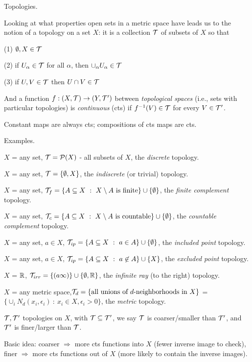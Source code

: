 \documentclass[12pt]{article}
\begin{document}
\msk

Topologies.

Looking at what properties open sets in a metric space have leads us to the 
notion of a topology on a set $X$: it is a collection ${\mathcal T}$ of subsets of $X$ so that

(1) $\emptyset,X\in {\mathcal T}$

(2) if $U_\alpha\in{\mathcal T}$ for all $\alpha$, then $\cup_\alpha U_\alpha\in{\mathcal T}$

(3) if $U,V\in{\mathcal T}$ then $U\cap V\in{\mathcal T}$

And a function $f:(X,{\mathcal T})\rightarrow(Y,{\mathcal T}^\prime)$ between {\it topological spaces}
(i.e., sets with particular topologies) is {\it continuous} (cts) if
$f^{-1}(V)\in{\mathcal T}$ for every $V\in{\mathcal T}^\prime$.

Constant maps are always cts; compositions of cts maps are cts.

\msk

Examples.

$X$ = any set, ${\mathcal T}={\mathcal P}(X)$ - all subsets of $X$, the {\it discrete} topology.

$X$ = any set, ${\mathcal T}=\{\emptyset,X\}$, the {\it indiscrete} (or trivial) topology.

$X$ = any set, $\mt_f=\{A\subseteq X\ :\ X\setminus A\ \textrm{is finite}\}\cup\{\emptyset\}$, the {\it finite complement} topology.

$X$ = any set, $\mt_c=\{A\subseteq X\ :\ X\setminus A\ \textrm{is countable}\}\cup\{\emptyset\}$, the {\it countable complement} topology.

$X$ = any set, $a\in X$, ${\mathcal T}_{ip}=\{A\subseteq X\ :\ a\in A\}\cup\{\emptyset\}$, the {\it included point} topology.

$X$ = any set, $a\in X$, ${\mathcal T}_{ip}=\{A\subseteq X\ :\ a\not\in A\}\cup\{X\}$, the {\it excluded point} topology.

$X$ = ${\mathbb R}$, ${\mathcal T}_{irr}=\{(a\infty)\}\cup\{\emptyset,{\mathbb R}\}$, the {\it infinite ray} (to the right) topology.

$X$ = any metric space,${\mathcal T}_{d}=\{\textrm{all unions of $d$-neighborhoods in }X\}$
= $\{\cup_i N_d(x_i,\epsilon_i)\ :\ x_i\in X, \epsilon_i>0\}$, the {\it metric} topology.

${\mathcal T},{\mathcal T}^\prime$ topologies on $X$, with ${\mathcal T}\subseteq{\mathcal T}^\prime$, we say 
${\mathcal T}$ is coarser/smaller than ${\mathcal T}^\prime$, and ${\mathcal T}^\prime$ is finer/larger than ${\mathcal T}$.

Basic idea: coarser $\Rightarrow$ more cts functions into $X$ (fewer inverse image to check), 
finer $\Rightarrow$ more cts functions out of $X$ (more likely to contain the inverse images).
\end{document}
